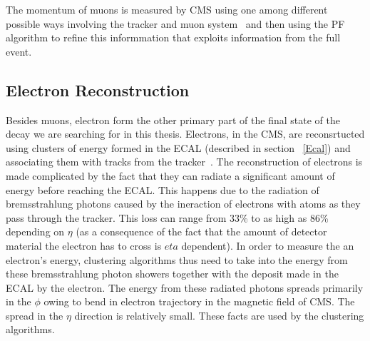 The momentum of muons is measured by CMS using one among different possible ways involving the tracker and muon system~\cite{muon_recon2012} and then using the PF algorithm to refine this informmation that exploits information from the full event.



\subsection{Electron Reconstruction}
\label{e_recon}
Besides muons, electron form the other primary part of the final state of the decay we are searching for in this thesis. Electrons, in the CMS, are reconsrtucted using clusters of energy formed in the ECAL (described in section ~\ref{Ecal}) and associating them with tracks from the tracker~\cite{e_recon}. The reconstruction of electrons is made complicated by the fact that they can radiate a significant amount of energy before reaching the ECAL. This happens due to the radiation of bremsstrahlung photons caused by the ineraction of electrons with atoms as they pass through the tracker. This loss can range from 33\% to as high as 86\% depending on $\eta$ (as a consequence of the fact that the amount of detector material the electron has to cross is $eta$ dependent). In order to measure the an electron's energy,  clustering algorithms thus need to take into the energy from these bremsstrahlung photon showers together with the deposit made in the ECAL by the electron. The energy from these radiated photons spreads primarily in the $\phi$ owing to bend in electron trajectory in the magnetic field of CMS. The spread in the $\eta$ direction is relatively small. These facts are used by the clustering algorithms.

